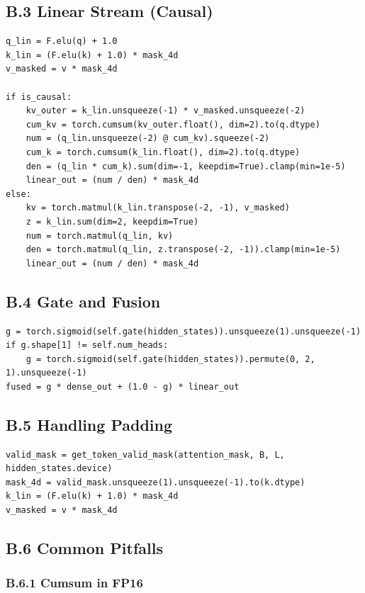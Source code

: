 \subsection{B.3 Linear Stream (Causal)}

\begin{lstlisting}
q_lin = F.elu(q) + 1.0
k_lin = (F.elu(k) + 1.0) * mask_4d
v_masked = v * mask_4d

if is_causal:
    kv_outer = k_lin.unsqueeze(-1) * v_masked.unsqueeze(-2)
    cum_kv = torch.cumsum(kv_outer.float(), dim=2).to(q.dtype)
    num = (q_lin.unsqueeze(-2) @ cum_kv).squeeze(-2)
    cum_k = torch.cumsum(k_lin.float(), dim=2).to(q.dtype)
    den = (q_lin * cum_k).sum(dim=-1, keepdim=True).clamp(min=1e-5)
    linear_out = (num / den) * mask_4d
else:
    kv = torch.matmul(k_lin.transpose(-2, -1), v_masked)
    z = k_lin.sum(dim=2, keepdim=True)
    num = torch.matmul(q_lin, kv)
    den = torch.matmul(q_lin, z.transpose(-2, -1)).clamp(min=1e-5)
    linear_out = (num / den) * mask_4d
\end{lstlisting}

\subsection{B.4 Gate and Fusion}

\begin{lstlisting}
g = torch.sigmoid(self.gate(hidden_states)).unsqueeze(1).unsqueeze(-1)
if g.shape[1] != self.num_heads:
    g = torch.sigmoid(self.gate(hidden_states)).permute(0, 2, 1).unsqueeze(-1)
fused = g * dense_out + (1.0 - g) * linear_out
\end{lstlisting}

\subsection{B.5 Handling Padding}

\begin{lstlisting}
valid_mask = get_token_valid_mask(attention_mask, B, L, hidden_states.device)
mask_4d = valid_mask.unsqueeze(1).unsqueeze(-1).to(k.dtype)
k_lin = (F.elu(k) + 1.0) * mask_4d
v_masked = v * mask_4d
\end{lstlisting}

\subsection{B.6 Common Pitfalls}

\subsubsection{B.6.1 Cumsum in FP16}

